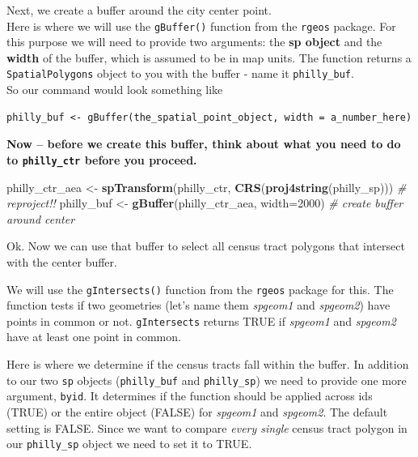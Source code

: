 \documentclass[]{book}
\newenvironment{Shaded}{\begin{snugshade}}{\end{snugshade}}
\newcommand{\KeywordTok}[1]{\textcolor[rgb]{0.13,0.29,0.53}{\textbf{#1}}}
\newcommand{\DataTypeTok}[1]{\textcolor[rgb]{0.13,0.29,0.53}{#1}}
\newcommand{\DecValTok}[1]{\textcolor[rgb]{0.00,0.00,0.81}{#1}}
\newcommand{\StringTok}[1]{\textcolor[rgb]{0.31,0.60,0.02}{#1}}
\newcommand{\CommentTok}[1]{\textcolor[rgb]{0.56,0.35,0.01}{\textit{#1}}}
\newcommand{\NormalTok}[1]{#1}
\theoremstyle{definition}
\theoremstyle{definition}
\theoremstyle{definition}
\theoremstyle{remark}
\begin{document}
Next, we create a buffer around the city center point.\\
Here is where we will use the \texttt{gBuffer()} function from the
\texttt{rgeos} package. For this purpose we will need to provide two
arguments: the \textbf{sp object} and the \textbf{width} of the buffer,
which is assumed to be in map units. The function returns a
\texttt{SpatialPolygons} object to you with the buffer - name it
\texttt{philly\_buf}.\\
So our command would look something like

\begin{verbatim}
philly_buf <- gBuffer(the_spatial_point_object, width = a_number_here)
\end{verbatim}

\textbf{Now -- before we create this buffer, think about what you need
to do to \texttt{philly\_ctr} before you proceed.}

\begin{Shaded}
\begin{Highlighting}[]
\NormalTok{philly_ctr_aea <-}\StringTok{ }\KeywordTok{spTransform}\NormalTok{(philly_ctr, }\KeywordTok{CRS}\NormalTok{(}\KeywordTok{proj4string}\NormalTok{(philly_sp))) }\CommentTok{# reproject!!}
\NormalTok{philly_buf <-}\StringTok{ }\KeywordTok{gBuffer}\NormalTok{(philly_ctr_aea, }\DataTypeTok{width=}\DecValTok{2000}\NormalTok{)  }\CommentTok{# create buffer around center}
\end{Highlighting}
\end{Shaded}

Ok. Now we can use that buffer to select all census tract polygons that
intersect with the center buffer.

We will use the \texttt{gIntersects()} function from the \texttt{rgeos}
package for this. The function tests if two geometries (let's name them
\emph{spgeom1} and \emph{spgeom2}) have points in common or not.
\texttt{gIntersects} returns TRUE if \emph{spgeom1} and \emph{spgeom2}
have at least one point in common.

Here is where we determine if the census tracts fall within the buffer.
In addition to our two \texttt{sp} objects (\texttt{philly\_buf} and
\texttt{philly\_sp}) we need to provide one more argument,
\texttt{byid}. It determines if the function should be applied across
ids (TRUE) or the entire object (FALSE) for \emph{spgeom1} and
\emph{spgeom2}. The default setting is FALSE. Since we want to compare
\emph{every single} census tract polygon in our \texttt{philly\_sp}
object we need to set it to TRUE.
\end{document}
